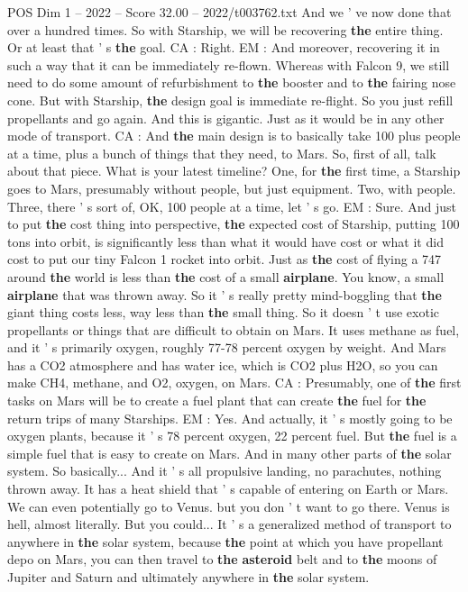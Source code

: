\begin{textsample}{POS Dim 1 – 2022 – Score 32.00 – 2022/t003762.txt}
And we ' ve now done that over a hundred times.
So with Starship, we will be recovering \textbf{the} entire thing.
Or at least that ' s \textbf{the} goal.
CA : Right.
EM : And moreover, recovering it in such a way that it can be immediately re-flown.
Whereas with Falcon 9, we still need to do some amount of refurbishment to \textbf{the} booster and to \textbf{the} fairing nose cone.
But with Starship, \textbf{the} design goal is immediate re-flight.
So you just refill propellants and go again.
And this is gigantic.
Just as it would be in any other mode of transport.
CA : And \textbf{the} main design is to basically take 100 plus people at a time, plus a bunch of things that they need, to Mars.
So, first of all, talk about that piece.
What is your latest timeline?
One, for \textbf{the} first time, a Starship goes to Mars, presumably without people, but just equipment.
Two, with people.
Three, there ' s sort of, OK, 100 people at a time, let ' s go.
EM : Sure.
And just to put \textbf{the} cost thing into perspective, \textbf{the} expected cost of Starship, putting 100 tons into orbit, is significantly less than what it would have cost or what it did cost to put our tiny Falcon 1 rocket into orbit.
Just as \textbf{the} cost of flying a 747 around \textbf{the} world is less than \textbf{the} cost of a small \textbf{airplane}.
You know, a small \textbf{airplane} that was thrown away.
So it ' s really pretty mind-boggling that \textbf{the} giant thing costs less, way less than \textbf{the} small thing.
So it doesn ' t use exotic propellants or things that are difficult to obtain on Mars.
It uses methane as fuel, and it ' s primarily oxygen, roughly 77-78 percent oxygen by weight.
And Mars has a CO2 atmosphere and has water ice, which is CO2 plus H2O, so you can make CH4, methane, and O2, oxygen, on Mars.
CA : Presumably, one of \textbf{the} first tasks on Mars will be to create a fuel plant that can create \textbf{the} fuel for \textbf{the} return trips of many Starships.
EM : Yes.
And actually, it ' s mostly going to be oxygen plants, because it ' s 78 percent oxygen, 22 percent fuel.
But \textbf{the} fuel is a simple fuel that is easy to create on Mars.
And in many other parts of \textbf{the} solar system.
So basically...
And it ' s all propulsive landing, no parachutes, nothing thrown away.
It has a heat shield that ' s capable of entering on Earth or Mars.
We can even potentially go to Venus. but you don ' t want to go there.
Venus is hell, almost literally.
But you could...
It ' s a generalized method of transport to anywhere in \textbf{the} solar system, because \textbf{the} point at which you have propellant depo on Mars, you can then travel to \textbf{the} \textbf{asteroid} belt and to \textbf{the} moons of Jupiter and Saturn and ultimately anywhere in \textbf{the} solar system.

\end{textsample}
